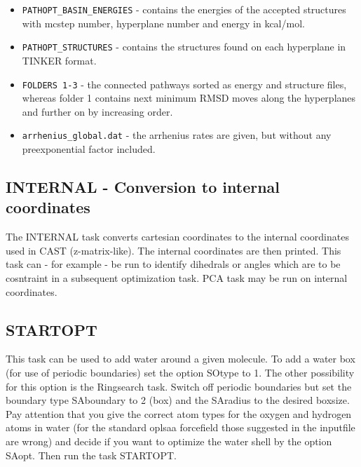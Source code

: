 \documentclass[10pt,a4paper]{article} %
\begin{document}
\begin{itemize}
	
	\item \texttt{PATHOPT\_BASIN\_ENERGIES} - contains the energies of the accepted structures with mcstep number, hyperplane number and energy in kcal/mol.
	
	\item \texttt{PATHOPT\_STRUCTURES} - contains the structures found on each hyperplane in TINKER format.
	
	\item \texttt{FOLDERS 1-3} - the connected pathways sorted as energy and structure files, whereas folder 1 contains next minimum RMSD moves along the hyperplanes and further on by increasing order.
	
	
	\item \texttt{arrhenius\_global.dat} - the arrhenius rates are given, but without any preexponential factor included.
	
\end{itemize}
	
	\subsection{INTERNAL - Conversion to internal coordinates}	
	The INTERNAL task converts cartesian coordinates to the internal coordinates used in CAST (z-matrix-like). The internal coordinates are then printed. This task can - for example - be run to identify dihedrals or angles which are to be cosntraint in a subsequent optimization task. \ac{PCA} task may be run on internal coordinates.

	\subsection{STARTOPT}	
	
	This task can be used to add water around a given molecule. To add a water box (for use of periodic boundaries) set the option SOtype to 1. The other possibility for this option is the Ringsearch task. Switch off periodic boundaries but set the boundary type SAboundary to 2 (box) and the SAradius to the desired boxsize. Pay attention that you give the correct atom types for the oxygen and hydrogen atoms in water (for the standard oplsaa forcefield those suggested in the inputfile are wrong) and decide if you want to optimize the water shell by the option SAopt. Then run the task STARTOPT.\\
	
\end{document}
